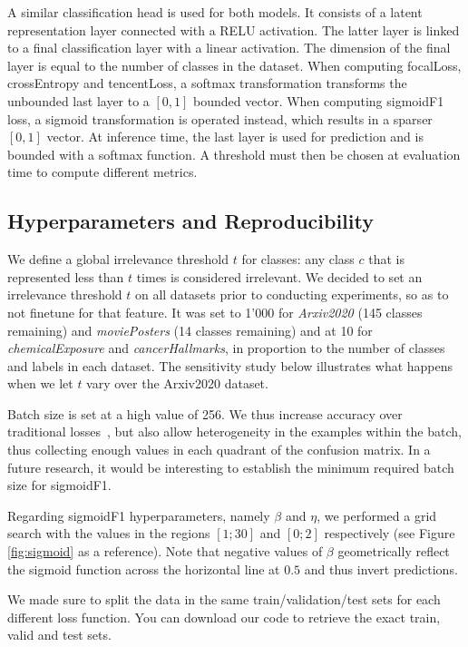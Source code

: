 A similar classification head is used for both models. It consists of a latent representation layer connected with a RELU activation. The latter layer is linked to a final classification layer with a linear activation. The dimension of the final layer is equal to the number of classes in the dataset. When computing focalLoss, crossEntropy and tencentLoss, a softmax transformation transforms the unbounded last layer to a $[0,1]$ bounded vector. When computing sigmoidF1 loss, a sigmoid transformation is operated instead, which results in a sparser $[0,1]$ vector. At inference time, the last layer is used for prediction and is bounded with a softmax function. A threshold must then be chosen at evaluation time to compute different metrics.

\subsection{Hyperparameters and Reproducibility}

We define a global irrelevance threshold $t$ for classes: any class $c$ that is represented less than $t$ times is considered irrelevant. We decided to set an irrelevance threshold $t$ on all datasets prior to conducting experiments, so as to not finetune for that feature. It was set to 1'000 for \emph{Arxiv2020} (145 classes remaining) and \emph{moviePosters} (14 classes remaining) and at 10 for \emph{chemicalExposure} and \emph{cancerHallmarks}, in proportion to the number of classes and labels in each dataset. The sensitivity study below illustrates what happens when we let $t$ vary over the Arxiv2020 dataset.

Batch size is set at a high value of 256. We thus increase accuracy over traditional losses~\cite{bigBS}, but also allow heterogeneity in the examples within the batch, thus collecting enough values in  each quadrant of the confusion matrix. In a future research, it would be interesting to establish the minimum required batch size for sigmoidF1.

Regarding sigmoidF1 hyperparameters, namely $\beta$ and $\eta$, we performed a grid search with the values in the regions $[1;30]$ and $[0;2]$ respectively (see Figure \ref{fig:sigmoid} as a reference). Note that negative values of $\beta$ geometrically reflect the sigmoid function across the horizontal line at $0.5$ and thus invert predictions.

We made sure to split the data in the same train/validation/test sets for each different loss function. You can download our code to retrieve the exact train, valid and test sets.

